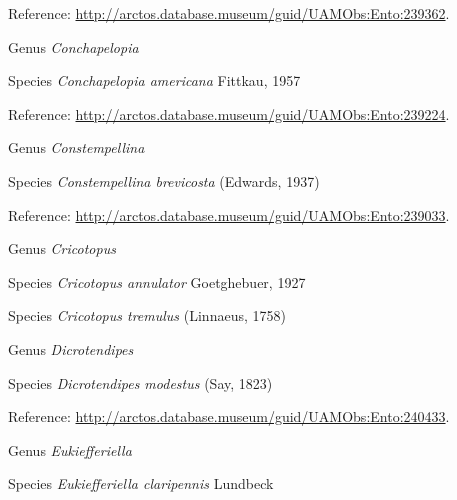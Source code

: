 \documentclass[9pt, article]{memoir}
\begin{document}
\begin{multicols}{2}
Reference: 
\url{http://arctos.database.museum/guid/UAMObs:Ento:239362}.

\vspace{6pt}\noindent\hspace{30pt}Genus \textit{Conchapelopia}


\vspace{6pt}\noindent\hspace{36pt}Species \textit{Conchapelopia americana} Fittkau, 1957


Reference: 
\url{http://arctos.database.museum/guid/UAMObs:Ento:239224}.

\vspace{6pt}\noindent\hspace{30pt}Genus \textit{Constempellina}


\vspace{6pt}\noindent\hspace{36pt}Species \textit{Constempellina brevicosta} (Edwards, 1937)


Reference: 
\url{http://arctos.database.museum/guid/UAMObs:Ento:239033}.

\vspace{6pt}\noindent\hspace{30pt}Genus \textit{Cricotopus}


\vspace{6pt}\noindent\hspace{36pt}Species \textit{Cricotopus annulator} Goetghebuer, 1927


\vspace{6pt}\noindent\hspace{36pt}Species \textit{Cricotopus tremulus} (Linnaeus, 1758)


\vspace{6pt}\noindent\hspace{30pt}Genus \textit{Dicrotendipes}


\vspace{6pt}\noindent\hspace{36pt}Species \textit{Dicrotendipes modestus} (Say, 1823)


Reference: 
\url{http://arctos.database.museum/guid/UAMObs:Ento:240433}.

\vspace{6pt}\noindent\hspace{30pt}Genus \textit{Eukiefferiella}


\vspace{6pt}\noindent\hspace{36pt}Species \textit{Eukiefferiella claripennis} Lundbeck



\end{multicols}
\end{document}
